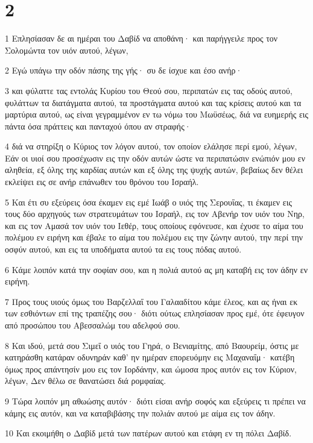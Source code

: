 \chapter{2}

\par 1 Επλησίασαν δε αι ημέραι του Δαβίδ να αποθάνη· και παρήγγειλε προς τον Σολομώντα τον υιόν αυτού, λέγων,
\par 2 Εγώ υπάγω την οδόν πάσης της γής· συ δε ίσχυε και έσο ανήρ·
\par 3 και φύλαττε τας εντολάς Κυρίου του Θεού σου, περιπατών εις τας οδούς αυτού, φυλάττων τα διατάγματα αυτού, τα προστάγματα αυτού και τας κρίσεις αυτού και τα μαρτύρια αυτού, ως είναι γεγραμμένον εν τω νόμω του Μωϋσέως, διά να ευημερής εις πάντα όσα πράττεις και πανταχού όπου αν στραφής·
\par 4 διά να στηρίξη ο Κύριος τον λόγον αυτού, τον οποίον ελάλησε περί εμού, λέγων, Εάν οι υιοί σου προσέχωσιν εις την οδόν αυτών ώστε να περιπατώσιν ενώπιόν μου εν αληθεία, εξ όλης της καρδίας αυτών και εξ όλης της ψυχής αυτών, βεβαίως δεν θέλει εκλείψει εις σε ανήρ επάνωθεν του θρόνου του Ισραήλ.
\par 5 Και έτι συ εξεύρεις όσα έκαμεν εις εμέ Ιωάβ ο υιός της Σερουΐας, τι έκαμεν εις τους δύο αρχηγούς των στρατευμάτων του Ισραήλ, εις τον Αβενήρ τον υιόν του Νηρ, και εις τον Αμασά τον υιόν του Ιεθέρ, τους οποίους εφόνευσε, και έχυσε το αίμα του πολέμου εν ειρήνη και έβαλε το αίμα του πολέμου εις την ζώνην αυτού, την περί την οσφύν αυτού, και εις τα υποδήματα αυτού τα εις τους πόδας αυτού.
\par 6 Κάμε λοιπόν κατά την σοφίαν σου, και η πολιά αυτού ας μη καταβή εις τον άδην εν ειρήνη.
\par 7 Προς τους υιούς όμως του Βαρζελλαΐ του Γαλααδίτου κάμε έλεος, και ας ήναι εκ των εσθιόντων επί της τραπέζης σου· διότι ούτως επλησίασαν προς εμέ, ότε έφευγον από προσώπου του Αβεσσαλώμ του αδελφού σου.
\par 8 Και ιδού, μετά σου Σιμεΐ ο υιός του Γηρά, ο Βενιαμίτης, από Βαουρείμ, όστις με κατηράσθη κατάραν οδυνηράν καθ' ην ημέραν επορευόμην εις Μαχαναΐμ· κατέβη όμως προς απάντησίν μου εις τον Ιορδάνην, και ώμοσα προς αυτόν εις τον Κύριον, λέγων, Δεν θέλω σε θανατώσει διά ρομφαίας.
\par 9 Τώρα λοιπόν μη αθωώσης αυτόν· διότι είσαι ανήρ σοφός και εξεύρεις τι πρέπει να κάμης εις αυτόν, και να καταβιβάσης την πολιάν αυτού με αίμα εις τον άδην.
\par 10 Και εκοιμήθη ο Δαβίδ μετά των πατέρων αυτού και ετάφη εν τη πόλει Δαβίδ.
